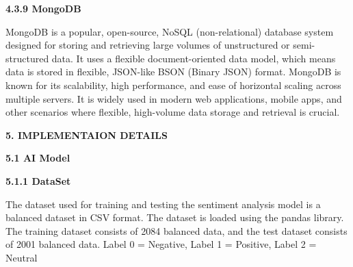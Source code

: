 \documentclass[a4paper,12pt]{article}
\begin{document}
{{{ \begin{flushleft}
			\fontsize{13}{15}\selectfont\textbf{4.3.9 MongoDB}
			\label{mongo}
		\end{flushleft}

MongoDB is a popular, open-source, NoSQL (non-relational) database system designed for storing and retrieving large volumes of unstructured or semi-structured data. It uses a flexible document-oriented data model, which means data is stored in flexible, JSON-like BSON (Binary JSON) format. MongoDB is known for its scalability, high performance, and ease of horizontal scaling across multiple servers. It is widely used in modern web applications, mobile apps, and other scenarios where flexible, high-volume data storage and retrieval is crucial.

		












  
		\newpage
		
								
		\begin{flushleft}
			\fontsize{14}{16}\selectfont\textbf{5. IMPLEMENTAION DETAILS}
			\label{implementation}
		\end{flushleft}






  \begin{flushleft}
			\fontsize{13}{15}\selectfont\textbf{5.1 AI Model}
			\phantomsection
			\label{ai}
		\end{flushleft}


  \begin{flushleft}
			\fontsize{13}{15}\selectfont\textbf{5.1.1 DataSet}
			\label{data}
		\end{flushleft}
  The dataset used for training and testing the sentiment analysis model is a balanced dataset in CSV format. The dataset is loaded using the pandas library. The training dataset consists of 2084 balanced data, and the test dataset consists of 2001 balanced data. Label 0 = Negative, Label 1 = Positive, Label 2 = Neutral \cite{shushant_nepali_sentiment}


}}}
\end{document}
